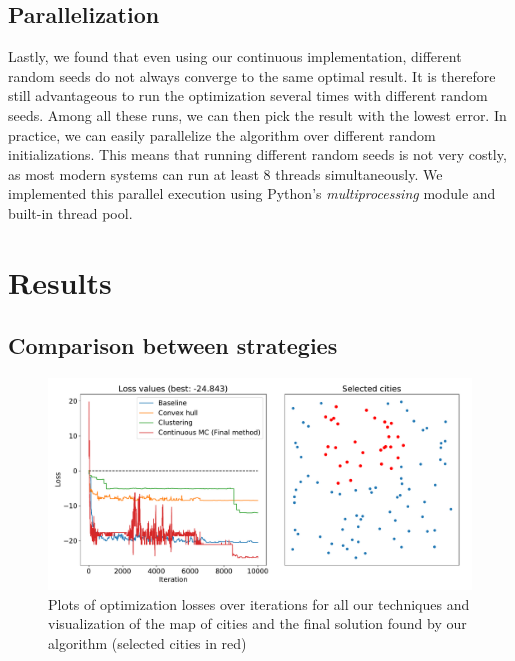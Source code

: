 \documentclass[conference,compsoc]{IEEEtran}
\begin{document}
\subsection{Parallelization}
Lastly, we found that even using our continuous implementation, different random
seeds do not always converge to the same optimal result. It is therefore still
advantageous to run the optimization several times with different random seeds.
Among all these runs, we can then pick the result with the lowest error. In
practice, we can easily parallelize the algorithm over different random
initializations. This means that running different random seeds is not very
costly, as most modern systems can run at least 8 threads simultaneously. We
implemented this parallel execution using Python's \emph{multiprocessing} module
and built-in thread pool.

\section{Results}
\label{sec:results}

\subsection{Comparison between strategies}


\begin{figure}
    \centering
    \includegraphics[width=\columnwidth,height=0.5\columnwidth]{images/selected_cities_plot.pdf}
    \caption{Plots of optimization losses over iterations for all our techniques
    and visualization of the map of cities and the final solution found by our
    algorithm (selected cities in red)}
    \label{fig:selection}
\end{figure}
\end{document}
